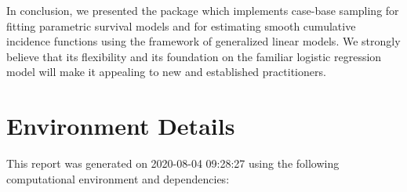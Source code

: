 \documentclass[
]{jss}
\begin{document}
In conclusion, we presented the  package 
which implements case-base sampling for fitting parametric survival
models and for estimating smooth cumulative incidence functions using
the framework of generalized linear models. We strongly believe that its
flexibility and its foundation on the familiar logistic regression model
will make it appealing to new and established practitioners.

\hypertarget{environment-details}{%
\section{Environment Details}\label{environment-details}}

This report was generated on 2020-08-04 09:28:27 using the following
computational environment and dependencies:
\end{document}
